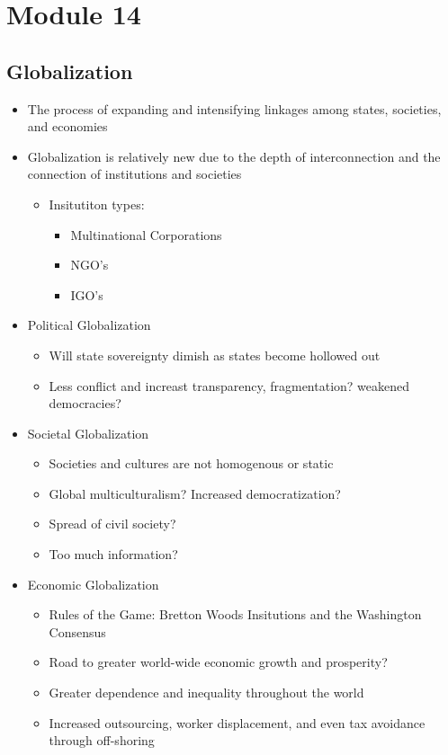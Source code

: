 \documentclass[11pt]{article}
\author{Sudhan Chitgopkar}
\date{\today}
\title{}
\begin{document}
\tableofcontents

\section{Module 14}
\label{sec:org4d771bb}
\subsection{Globalization}
\label{sec:org39cab36}
\begin{itemize}
\item The process of expanding and intensifying linkages among states, societies, and economies
\item Globalization is relatively new due to the depth of interconnection and the connection of institutions and societies
\begin{itemize}
\item Insitutiton types:
\begin{itemize}
\item Multinational Corporations
\item NGO's
\item IGO's
\end{itemize}
\end{itemize}
\item Political Globalization
\begin{itemize}
\item Will state sovereignty dimish as states become hollowed out
\item Less conflict and increast transparency, fragmentation? weakened democracies?
\end{itemize}
\item Societal Globalization
\begin{itemize}
\item Societies and cultures are not homogenous or static
\item Global multiculturalism? Increased democratization?
\item Spread of civil society?
\item Too much information?
\end{itemize}
\item Economic Globalization
\begin{itemize}
\item Rules of the Game: Bretton Woods Insitutions and the Washington Consensus
\item Road to greater world-wide economic growth and prosperity?
\item Greater dependence and inequality throughout the world
\item Increased outsourcing, worker displacement, and even tax avoidance through off-shoring
\end{itemize}
\end{itemize}
\end{document}
